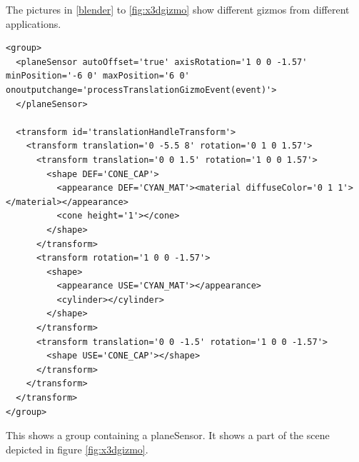 The pictures in \ref{blender} to \ref{fig:x3dgizmo} show different gizmos from
different applications.

\begin{listing}
  \begin{verbatim}
<group>
  <planeSensor autoOffset='true' axisRotation='1 0 0 -1.57' minPosition='-6 0' maxPosition='6 0' onoutputchange='processTranslationGizmoEvent(event)'>
  </planeSensor>

  <transform id='translationHandleTransform'>
    <transform translation='0 -5.5 8' rotation='0 1 0 1.57'>
      <transform translation='0 0 1.5' rotation='1 0 0 1.57'>
        <shape DEF='CONE_CAP'>
          <appearance DEF='CYAN_MAT'><material diffuseColor='0 1 1'></material></appearance>
          <cone height='1'></cone>
        </shape>
      </transform>
      <transform rotation='1 0 0 -1.57'>
        <shape>
          <appearance USE='CYAN_MAT'></appearance>
          <cylinder></cylinder>
        </shape>
      </transform>
      <transform translation='0 0 -1.5' rotation='1 0 0 -1.57'>
        <shape USE='CONE_CAP'></shape>
      </transform>
    </transform>
  </transform>
</group>
  \end{verbatim}
  \caption{This shows a group containing a planeSensor. It shows a part of the scene depicted in figure \ref{fig:x3dgizmo}.}
  \label{planesensor}
\end{listing}

